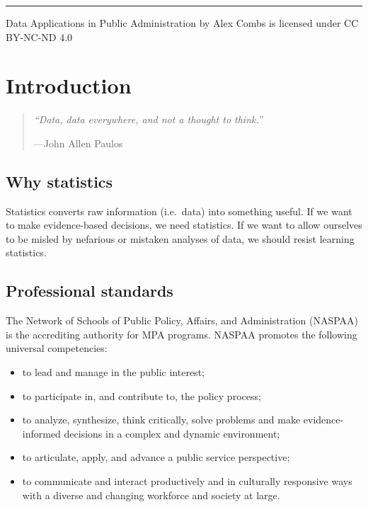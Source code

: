 \documentclass[
]{book}
\providecommand{\tightlist}{%
  \setlength{\itemsep}{0pt}\setlength{\parskip}{0pt}}
\begin{document}
\begin{center}\rule{0.5\linewidth}{0.5pt}\end{center}

{Data Applications in Public Administration} by Alex Combs is licensed under CC BY-NC-ND 4.0

\hypertarget{intro}{%
\chapter{Introduction}\label{intro}}

\begin{quote}
\emph{``Data, data everywhere, and not a thought to think.''}

---John Allen Paulos
\end{quote}

\hypertarget{why-statistics}{%
\section{Why statistics}\label{why-statistics}}

Statistics converts raw information (i.e.~data) into something useful. If we want to make evidence-based decisions, we need statistics. If we want to allow ourselves to be misled by nefarious or mistaken analyses of data, we should resist learning statistics.

\hypertarget{professional-standards}{%
\section{Professional standards}\label{professional-standards}}

The Network of Schools of Public Policy, Affairs, and Administration (NASPAA) is the accrediting authority for MPA programs. NASPAA promotes the following universal competencies:

\begin{itemize}
\tightlist
\item
  to lead and manage in the public interest;
\item
  to participate in, and contribute to, the policy process;
\item
  to analyze, synthesize, think critically, solve problems and make evidence-informed decisions in a complex and dynamic environment;
\item
  to articulate, apply, and advance a public service perspective;
\item
  to communicate and interact productively and in culturally responsive ways with a diverse and changing workforce and society at large.
\end{itemize}
\end{document}
